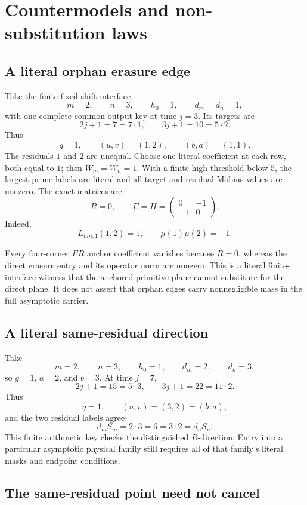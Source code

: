 \section{Countermodels and non-substitution laws}
\label{sec:countermodels}

\subsection{A literal orphan erasure edge}

Take the finite fixed-shift interface
\[
 m=2,\qquad n=3,\qquad h_0=1,\qquad d_m=d_n=1,
\]
with one complete common-output key at time \(j=3\).  Its targets are
\[
 2j+1=7=7\cdot1,\qquad
 3j+1=10=5\cdot2.
\]
Thus
\[
 q=1,\qquad (u,v)=(1,2),\qquad (b,a)=(1,1).
\]
The residuals \(1\) and \(2\) are unequal.  Choose one literal coefficient
at each row, both equal to \(1\); then \(W_m=W_n=1\).  With a finite high
threshold below \(5\), the largest-prime labels are literal and all target
and residual M\"obius values are nonzero.  The exact matrices are
\[
 R=0,\qquad
 E=H=
 \begin{pmatrix}
 0&-1\\
 -1&0
 \end{pmatrix}.
\]
Indeed,
\[
 L_{mn,1}(1,2)=1,\qquad
 \mu(1)\mu(2)=-1.
\]

Every four-corner \(ER\) anchor coefficient vanishes because \(R=0\),
whereas the direct erasure entry and its operator norm are nonzero.  This
is a literal finite-interface witness that the anchored primitive plane
cannot substitute for the direct plane.  It does not assert that orphan
edges carry nonnegligible mass in the full asymptotic carrier.

\subsection{A literal same-residual direction}

Take
\[
 m=2,\qquad n=3,\qquad h_0=1,\qquad d_m=2,\qquad d_n=3,
\]
so \(g=1\), \(a=2\), and \(b=3\).  At time \(j=7\),
\[
 2j+1=15=5\cdot3,\qquad
 3j+1=22=11\cdot2.
\]
Thus
\[
 q=1,\qquad (u,v)=(3,2)=(b,a),
\]
and the two residual labels agree:
\[
 d_mS_m=2\cdot3=6=3\cdot2=d_nS_n.
\]
This finite arithmetic key checks the distinguished \(R\)-direction.
Entry into a particular asymptotic physical family still requires all
of that family's literal masks and endpoint conditions.

\subsection{The same-residual point need not cancel}


